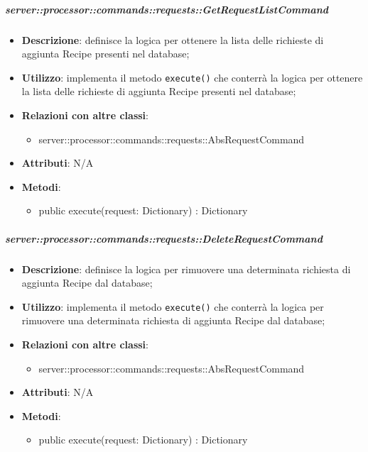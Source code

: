         \subparagraph{server::processor::commands::requests::GetRequestListCommand} %
        \label{subp:bdsm_app_server_processor_commands_requests_getrequestlistcommand}
        \begin{itemize}
          \item \textbf{Descrizione}: definisce la logica per ottenere la lista delle richieste di aggiunta Recipe presenti nel database;
          \item \textbf{Utilizzo}: implementa il metodo \texttt{execute()} che conterrà la logica per ottenere la lista delle richieste di aggiunta Recipe presenti nel database;
          \item \textbf{Relazioni con altre classi}:
            \begin{itemize}
              \item server::processor::commands::requests::AbsRequestCommand
            \end{itemize}
			\item \textbf{Attributi}: N/A
			\item \textbf{Metodi}:
        	\begin{itemize}
          		\item public execute(request: Dictionary) : Dictionary
        	\end{itemize}
        \end{itemize}

        \subparagraph{server::processor::commands::requests::DeleteRequestCommand} %
        \label{subp:bdsm_app_server_processor_commands_requests_deleterequestcommand}
        \begin{itemize}
          \item \textbf{Descrizione}: definisce la logica per rimuovere una determinata richiesta di aggiunta Recipe dal database;
          \item \textbf{Utilizzo}: implementa il metodo \texttt{execute()} che conterrà la logica per rimuovere una determinata richiesta di aggiunta Recipe dal database;
          \item \textbf{Relazioni con altre classi}:
            \begin{itemize}
              \item server::processor::commands::requests::AbsRequestCommand
            \end{itemize}
			\item \textbf{Attributi}: N/A
			\item \textbf{Metodi}:
        	\begin{itemize}
          		\item public execute(request: Dictionary) : Dictionary
        	\end{itemize}
        \end{itemize}

